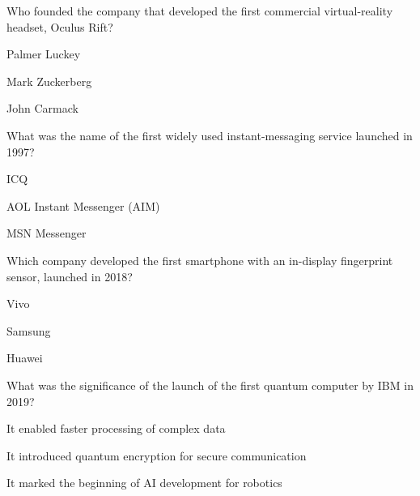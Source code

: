 \begin{enhancedmcq}{Who founded the company that developed the first commercial virtual-reality headset, Oculus Rift?}
\item Palmer Luckey
\item Mark Zuckerberg
\item John Carmack

\end{enhancedmcq}
\begin{enhancedmcq}{What was the name of the first widely used instant-messaging service launched in 1997?}
\item ICQ
\item AOL Instant Messenger (AIM)
\item MSN Messenger

\end{enhancedmcq}
\begin{enhancedmcq}{Which company developed the first smartphone with an in-display fingerprint sensor, launched in 2018?}
\item Vivo
\item Samsung
\item Huawei

\end{enhancedmcq}
\begin{enhancedmcq}{What was the significance of the launch of the first quantum computer by IBM in 2019?}
\item It enabled faster processing of complex data
\item It introduced quantum encryption for secure communication
\item It marked the beginning of AI development for robotics
\end{enhancedmcq}